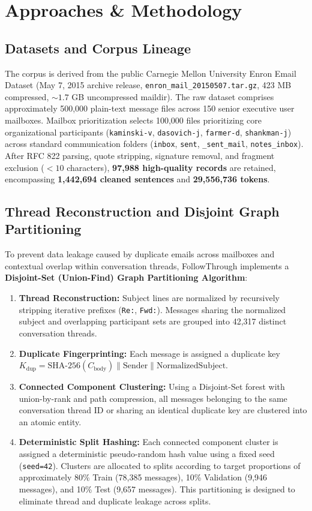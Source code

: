 \documentclass[conference]{IEEEtran}
\begin{document}
\section{Approaches \& Methodology}
\subsection{Datasets and Corpus Lineage}
The corpus is derived from the public Carnegie Mellon University Enron Email Dataset (May 7, 2015 archive release, \texttt{enron\_mail\_20150507.tar.gz}, 423 MB compressed, $\sim 1.7$ GB uncompressed maildir). The raw dataset comprises approximately 500,000 plain-text message files across 150 senior executive user mailboxes. Mailbox prioritization selects 100,000 files prioritizing core organizational participants (\texttt{kaminski-v}, \texttt{dasovich-j}, \texttt{farmer-d}, \texttt{shankman-j}) across standard communication folders (\texttt{inbox}, \texttt{sent}, \texttt{\_sent\_mail}, \texttt{notes\_inbox}). After RFC 822 parsing, quote stripping, signature removal, and fragment exclusion ($<10$ characters), \textbf{97,988 high-quality records} are retained, encompassing \textbf{1,442,694 cleaned sentences} and \textbf{29,556,736 tokens}.

\subsection{Thread Reconstruction and Disjoint Graph Partitioning}
To prevent data leakage caused by duplicate emails across mailboxes and contextual overlap within conversation threads, FollowThrough implements a \textbf{Disjoint-Set (Union-Find) Graph Partitioning Algorithm}:
\begin{enumerate}
    \item \textbf{Thread Reconstruction:} Subject lines are normalized by recursively stripping iterative prefixes (\texttt{Re:}, \texttt{Fwd:}). Messages sharing the normalized subject and overlapping participant sets are grouped into 42,317 distinct conversation threads.
    \item \textbf{Duplicate Fingerprinting:} Each message is assigned a duplicate key $K_{\text{dup}} = \text{SHA-256}(C_{\text{body}}) \parallel \text{Sender} \parallel \text{NormalizedSubject}$.
    \item \textbf{Connected Component Clustering:} Using a Disjoint-Set forest with union-by-rank and path compression, all messages belonging to the same conversation thread ID or sharing an identical duplicate key are clustered into an atomic entity.
    \item \textbf{Deterministic Split Hashing:} Each connected component cluster is assigned a deterministic pseudo-random hash value using a fixed seed (\texttt{seed=42}). Clusters are allocated to splits according to target proportions of approximately 80\% Train (78,385 messages), 10\% Validation (9,946 messages), and 10\% Test (9,657 messages). This partitioning is designed to eliminate thread and duplicate leakage across splits.
\end{enumerate}
\end{document}
